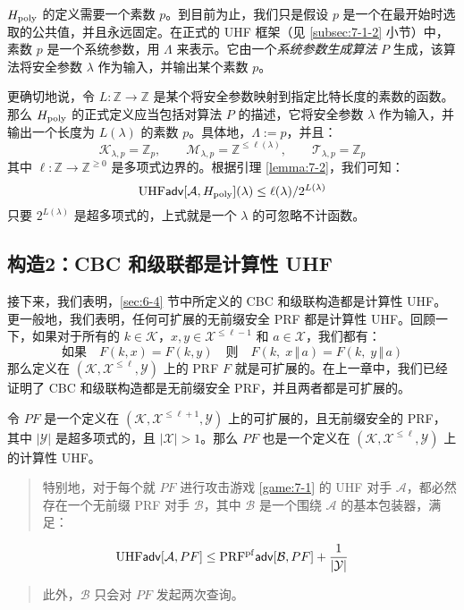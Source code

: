 \begin{snote}[数学细节。]
$H_{\rm poly}$ 的定义需要一个素数 $p$。到目前为止，我们只是假设 $p$ 是一个在最开始时选取的公共值，并且永远固定。在正式的 UHF 框架（见 \ref{subsec:7-1-2} 小节）中，素数 $p$ 是一个系统参数，用 $\Lambda$ 来表示。它由一个\emph{系统参数生成算法} $P$ 生成，该算法将安全参数 $\lambda$ 作为输入，并输出某个素数 $p$。

更确切地说，令 $L:\mathbb{Z}\to\mathbb{Z}$ 是某个将安全参数映射到指定比特长度的素数的函数。那么 $H_{\rm poly}$ 的正式定义应当包括对算法 $P$ 的描述，它将安全参数 $\lambda$ 作为输入，并输出一个长度为 $L(\lambda)$ 的素数 $p$。具体地，$\Lambda:=p$，并且：
\[
\mathcal{K}_{\lambda,p}=\mathbb{Z}_p,
\quad\quad
\mathcal{M}_{\lambda,p}=\mathbb{Z}^{\leq\ell(\lambda)},
\quad\quad
\mathcal{T}_{\lambda,p}=\mathbb{Z}_p
\]
其中 $\ell:\mathbb{Z}\to\mathbb{Z}^{\geq0}$ 是多项式边界的。根据引理 \ref{lemma:7-2}，我们可知：
\[
{\rm UHF}\mathsf{adv}[\mathcal{A},H_{\rm poly}](\lambda)\leq{\ell(\lambda)}/{2^{L(\lambda)}}
\]
只要 $2^{L(\lambda)}$ 是超多项式的，上式就是一个 $\lambda$ 的可忽略不计函数。
\end{snote}

\subsection{构造2：CBC 和级联都是计算性 UHF}\label{subsec:7-2-2}

接下来，我们表明，\ref{sec:6-4} 节中所定义的 CBC 和级联构造都是计算性 UHF。更一般地，我们表明，任何可扩展的无前缀安全 PRF 都是计算性 UHF。回顾一下，如果对于所有的 $k\in\mathcal{K}$，$x,y\in\mathcal{X}^{\leq\ell-1}$ 和 $a\in\mathcal{X}$，我们都有：
\[
\text{如果}\quad
F(k,x)=F(k,y)
\quad\text{则}\quad
F(k,\;x\,\Vert\,a)=F(k,\;y\,\Vert\,a)
\]
那么定义在 $(\mathcal{K},\mathcal{X}^{\leq\ell},\mathcal{Y})$ 上的 PRF $F$ 就是可扩展的。在上一章中，我们已经证明了 CBC 和级联构造都是无前缀安全 PRF，并且两者都是可扩展的。

\begin{theorem}\label{theo:7-3}
令 $PF$ 是一个定义在 $(\mathcal{K},\mathcal{X}^{\leq\ell+1},\mathcal{Y})$ 上的可扩展的，且无前缀安全的 PRF，其中 $|\mathcal{Y}|$ 是超多项式的，且 $|\mathcal{X}|>1$。那么 $PF$ 也是一个定义在 $(\mathcal{K},\mathcal{X}^{\leq\ell},\mathcal{Y})$ 上的计算性 UHF。
\begin{quote}
特别地，对于每个就 $PF$ 进行攻击游戏 \ref{game:7-1} 的 UHF 对手 $\mathcal{A}$，都必然存在一个无前缀 PRF 对手 $\mathcal{B}$，其中 $\mathcal{B}$ 是一个围绕 $\mathcal{A}$ 的基本包装器，满足：
\end{quote}
\begin{equation}\label{eq:7-6}
{\rm UHF}\mathsf{adv}[\mathcal{A},PF]\leq{\rm PRF^{pf}}\mathsf{adv}[\mathcal{B},PF]+\frac{1}{|\mathcal{Y}|}
\end{equation}
\begin{quote}
此外，$\mathcal{B}$ 只会对 $PF$ 发起两次查询。
\end{quote}
\end{theorem}

